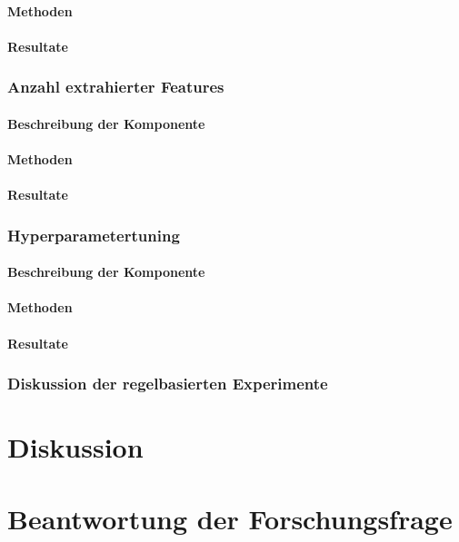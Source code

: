 \paragraph{Methoden}
\paragraph{Resultate}
\subsubsection{Anzahl extrahierter Features}
\paragraph{Beschreibung der Komponente}
\paragraph{Methoden}
\paragraph{Resultate}
\subsubsection{Hyperparametertuning}
\paragraph{Beschreibung der Komponente}
\paragraph{Methoden}
\paragraph{Resultate}
\subsubsection{Diskussion der regelbasierten Experimente}
\section{Diskussion}
\section{Beantwortung der Forschungsfrage}